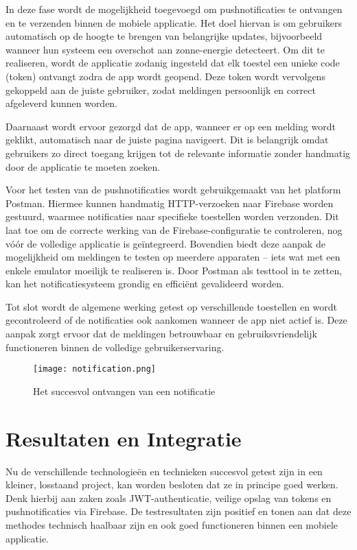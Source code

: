 In deze fase wordt de mogelijkheid toegevoegd om pushnotificaties te ontvangen en te verzenden binnen de mobiele applicatie. Het doel hiervan is om gebruikers automatisch op de hoogte te brengen van belangrijke updates, bijvoorbeeld wanneer hun systeem een overschot aan zonne-energie detecteert. Om dit te realiseren, wordt de applicatie zodanig ingesteld dat elk toestel een unieke code (token) ontvangt zodra de app wordt geopend. Deze token wordt vervolgens gekoppeld aan de juiste gebruiker, zodat meldingen persoonlijk en correct afgeleverd kunnen worden.

Daarnaast wordt ervoor gezorgd dat de app, wanneer er op een melding wordt geklikt, automatisch naar de juiste pagina navigeert. Dit is belangrijk omdat gebruikers zo direct toegang krijgen tot de relevante informatie zonder handmatig door de applicatie te moeten zoeken.

Voor het testen van de pushnotificaties wordt gebruikgemaakt van het platform Postman. Hiermee kunnen handmatig HTTP-verzoeken naar Firebase worden gestuurd, waarmee notificaties naar specifieke toestellen worden verzonden. Dit laat toe om de correcte werking van de Firebase-configuratie te controleren, nog vóór de volledige applicatie is geïntegreerd. Bovendien biedt deze aanpak de mogelijkheid om meldingen te testen op meerdere apparaten – iets wat met een enkele emulator moeilijk te realiseren is. Door Postman als testtool in te zetten, kan het notificatiesysteem grondig en efficiënt gevalideerd worden.

Tot slot wordt de algemene werking getest op verschillende toestellen en wordt gecontroleerd of de notificaties ook aankomen wanneer de app niet actief is. Deze aanpak zorgt ervoor dat de meldingen betrouwbaar en gebruiksvriendelijk functioneren binnen de volledige gebruikerservaring. \\

\begin{figure}[H]
	\centering
	\texttt{[image: notification.png]}
	\caption{Het succesvol ontvangen van een notificatie}
	\label{fig:notification}
\end{figure}

\section{Resultaten en Integratie}

Nu de verschillende technologieën en technieken succesvol getest zijn in een kleiner, losstaand project, kan worden besloten dat ze in principe goed werken. Denk hierbij aan zaken zoals JWT-authenticatie, veilige opslag van tokens en pushnotificaties via Firebase. De testresultaten zijn positief en tonen aan dat deze methodes technisch haalbaar zijn en ook goed functioneren binnen een mobiele applicatie.

